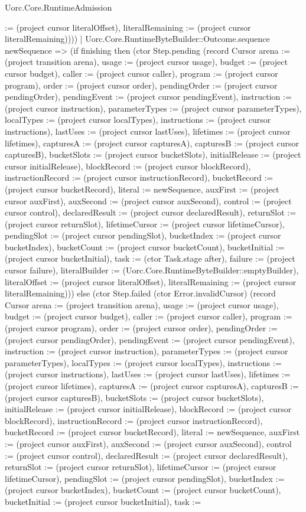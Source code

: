 \begin{lexlean}{Uorc.Core.RuntimeAdmission}
\begin{semanticmodule}
{:= (project cursor literalOffset), literalRemaining := (project cursor literalRemaining)})))
    | Uorc.Core.RuntimeByteBuilder::Outcome.sequence newSequence => (if finishing then (ctor Step.pending (record Cursor {arena := (project transition arena), usage := (project cursor usage), budget := (project cursor budget), caller := (project cursor caller), program := (project cursor program), order := (project cursor order), pendingOrder := (project cursor pendingOrder), pendingEvent := (project cursor pendingEvent), instruction := (project cursor instruction), parameterTypes := (project cursor parameterTypes), localTypes := (project cursor localTypes), instructions := (project cursor instructions), lastUses := (project cursor lastUses), lifetimes := (project cursor lifetimes), capturesA := (project cursor capturesA), capturesB := (project cursor capturesB), bucketSlots := (project cursor bucketSlots), initialRelease := (project cursor initialRelease), blockRecord := (project cursor blockRecord), instructionRecord := (project cursor instructionRecord), bucketRecord := (project cursor bucketRecord), literal := newSequence, auxFirst := (project cursor auxFirst), auxSecond := (project cursor auxSecond), control := (project cursor control), declaredResult := (project cursor declaredResult), returnSlot := (project cursor returnSlot), lifetimeCursor := (project cursor lifetimeCursor), pendingSlot := (project cursor pendingSlot), bucketIndex := (project cursor bucketIndex), bucketCount := (project cursor bucketCount), bucketInitial := (project cursor bucketInitial), task := (ctor Task.stage after), failure := (project cursor failure), literalBuilder := (Uorc.Core.RuntimeByteBuilder::emptyBuilder), literalOffset := (project cursor literalOffset), literalRemaining := (project cursor literalRemaining)})) else (ctor Step.failed (ctor Error.invalidCursor) (record Cursor {arena := (project transition arena), usage := (project cursor usage), budget := (project cursor budget), caller := (project cursor caller), program := (project cursor program), order := (project cursor order), pendingOrder := (project cursor pendingOrder), pendingEvent := (project cursor pendingEvent), instruction := (project cursor instruction), parameterTypes := (project cursor parameterTypes), localTypes := (project cursor localTypes), instructions := (project cursor instructions), lastUses := (project cursor lastUses), lifetimes := (project cursor lifetimes), capturesA := (project cursor capturesA), capturesB := (project cursor capturesB), bucketSlots := (project cursor bucketSlots), initialRelease := (project cursor initialRelease), blockRecord := (project cursor blockRecord), instructionRecord := (project cursor instructionRecord), bucketRecord := (project cursor bucketRecord), literal := newSequence, auxFirst := (project cursor auxFirst), auxSecond := (project cursor auxSecond), control := (project cursor control), declaredResult := (project cursor declaredResult), returnSlot := (project cursor returnSlot), lifetimeCursor := (project cursor lifetimeCursor), pendingSlot := (project cursor pendingSlot), bucketIndex := (project cursor bucketIndex), bucketCount := (project cursor bucketCount), bucketInitial := (project cursor bucketInitial), task := }
\end{semanticmodule}
\end{lexlean}
